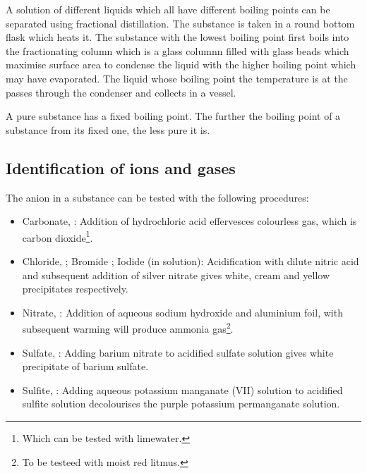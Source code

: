 A solution of different liquids which all have different boiling points can be separated using
fractional distillation. The substance is taken in a round bottom flask which heats it. The 
substance with the lowest boiling point first boils into the fractionating column which is a glass
columnn filled with glass beads which maximise surface area to condense the liquid with the higher
boiling point which may have evaporated. The liquid whose boiling point the temperature is at
the passes through the condenser and collects in a vessel.

A pure substance has a fixed boiling point. The further the boiling point of a substance from its
fixed one, the less pure it is.

\subsection{Identification of ions and gases}
The anion in a substance can be tested with the following procedures:
\begin{itemize}
	\item Carbonate, : Addition of hydrochloric acid effervesces colourless gas, which
		is carbon dioxide\footnote{Which can be tested with limewater.}.
	\item Chloride, ; Bromide ; Iodide  (in solution): Acidification with 
		dilute nitric
		acid and subsequent addition of silver nitrate gives white, cream and yellow precipitates
		respectively.
	\item Nitrate, : Addition of aqueous sodium hydroxide and aluminium foil, with
		subsequent warming will produce ammonia gas\footnote{To be testeed with moist red litmus.}.
	\item Sulfate, : Adding barium nitrate to acidified sulfate solution gives white
		precipitate of barium sulfate.
	\item Sulfite, : Adding aqueous potassium manganate (VII) solution to acidified
		sulfite solution decolourises the purple potassium permanganate solution.
\end{itemize} 

